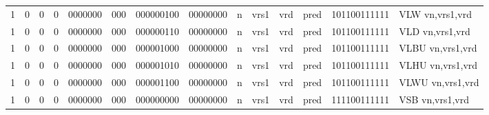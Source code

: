 \begin{landscape}
\begin{table}[p]
\begin{small}
\begin{center}
\begin{tabular}{p{0.08in}@{}p{0.08in}@{}p{0.08in}@{}p{0.08in}@{}p{0.50in}@{}p{0.30in}@{}p{0.08in}@{}p{0.8in}@{}p{0.48in}@{}p{0.32in}@{}p{0.08in}@{}p{0.8in}@{}p{0.8in}@{}p{0.4in}@{}p{0.56in}l}
\multicolumn{1}{|c|}{1} &
\multicolumn{1}{c|}{0} &
\multicolumn{1}{c|}{0} &
\multicolumn{1}{c|}{0} &
\multicolumn{1}{c|}{0000000} &
\multicolumn{1}{c|}{000} &
\multicolumn{2}{c|}{000000100} &
\multicolumn{2}{c|}{00000000} &
\multicolumn{1}{c|}{n} &
\multicolumn{1}{c|}{vrs1} &
\multicolumn{1}{c|}{vrd} &
\multicolumn{1}{c|}{pred} &
\multicolumn{1}{c|}{101100111111} & VLW vn,vrs1,vrd \\
\cline{1-15}
  

\multicolumn{1}{|c|}{1} &
\multicolumn{1}{c|}{0} &
\multicolumn{1}{c|}{0} &
\multicolumn{1}{c|}{0} &
\multicolumn{1}{c|}{0000000} &
\multicolumn{1}{c|}{000} &
\multicolumn{2}{c|}{000000110} &
\multicolumn{2}{c|}{00000000} &
\multicolumn{1}{c|}{n} &
\multicolumn{1}{c|}{vrs1} &
\multicolumn{1}{c|}{vrd} &
\multicolumn{1}{c|}{pred} &
\multicolumn{1}{c|}{101100111111} & VLD vn,vrs1,vrd \\
\cline{1-15}
  

\multicolumn{1}{|c|}{1} &
\multicolumn{1}{c|}{0} &
\multicolumn{1}{c|}{0} &
\multicolumn{1}{c|}{0} &
\multicolumn{1}{c|}{0000000} &
\multicolumn{1}{c|}{000} &
\multicolumn{2}{c|}{000001000} &
\multicolumn{2}{c|}{00000000} &
\multicolumn{1}{c|}{n} &
\multicolumn{1}{c|}{vrs1} &
\multicolumn{1}{c|}{vrd} &
\multicolumn{1}{c|}{pred} &
\multicolumn{1}{c|}{101100111111} & VLBU vn,vrs1,vrd \\
\cline{1-15}
  

\multicolumn{1}{|c|}{1} &
\multicolumn{1}{c|}{0} &
\multicolumn{1}{c|}{0} &
\multicolumn{1}{c|}{0} &
\multicolumn{1}{c|}{0000000} &
\multicolumn{1}{c|}{000} &
\multicolumn{2}{c|}{000001010} &
\multicolumn{2}{c|}{00000000} &
\multicolumn{1}{c|}{n} &
\multicolumn{1}{c|}{vrs1} &
\multicolumn{1}{c|}{vrd} &
\multicolumn{1}{c|}{pred} &
\multicolumn{1}{c|}{101100111111} & VLHU vn,vrs1,vrd \\
\cline{1-15}
  

\multicolumn{1}{|c|}{1} &
\multicolumn{1}{c|}{0} &
\multicolumn{1}{c|}{0} &
\multicolumn{1}{c|}{0} &
\multicolumn{1}{c|}{0000000} &
\multicolumn{1}{c|}{000} &
\multicolumn{2}{c|}{000001100} &
\multicolumn{2}{c|}{00000000} &
\multicolumn{1}{c|}{n} &
\multicolumn{1}{c|}{vrs1} &
\multicolumn{1}{c|}{vrd} &
\multicolumn{1}{c|}{pred} &
\multicolumn{1}{c|}{101100111111} & VLWU vn,vrs1,vrd \\
\cline{1-15}
  

\multicolumn{1}{|c|}{1} &
\multicolumn{1}{c|}{0} &
\multicolumn{1}{c|}{0} &
\multicolumn{1}{c|}{0} &
\multicolumn{1}{c|}{0000000} &
\multicolumn{1}{c|}{000} &
\multicolumn{2}{c|}{000000000} &
\multicolumn{2}{c|}{00000000} &
\multicolumn{1}{c|}{n} &
\multicolumn{1}{c|}{vrs1} &
\multicolumn{1}{c|}{vrd} &
\multicolumn{1}{c|}{pred} &
\multicolumn{1}{c|}{111100111111} & VSB vn,vrs1,vrd \\
\cline{1-15}
  


\end{tabular}
\end{center}
\end{small}
\end{table}
\end{landscape}

